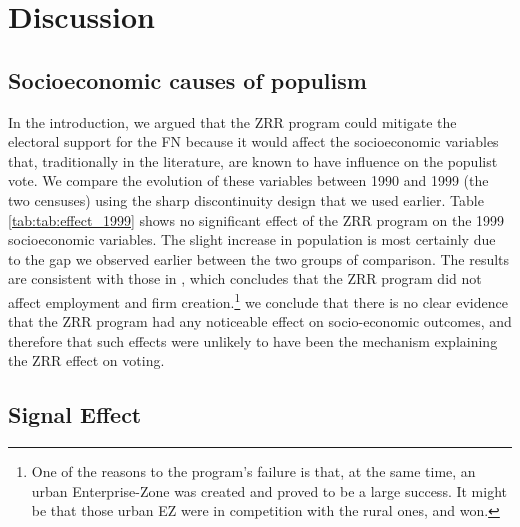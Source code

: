 \section{Discussion}\label{results}
\subsection{Socioeconomic causes of populism}

In the introduction, we argued that the ZRR program could mitigate the electoral support for the FN because it would affect the socioeconomic variables that, traditionally in the literature, are known to have influence on the populist vote. We compare the evolution of these variables between 1990 and 1999 (the two censuses) using the sharp discontinuity design that we used earlier. %
Table \ref{tab:tab:effect_1999} shows no significant effect of the ZRR program on the 1999 socioeconomic variables. The slight increase in population is most certainly due to the gap we observed earlier between the two groups of comparison. %
The results are consistent with those in \cite{BEHAGHEL20151}, which concludes that the ZRR program did not affect employment and firm creation.\footnote{One of the reasons to the program's failure is that, at the same time, an urban Enterprise-Zone was created and proved to be a large success. It might be that those urban EZ were in competition with the rural ones, and won.} we conclude that there is no clear evidence that the ZRR program had any noticeable effect on socio-economic outcomes, and therefore that such effects were unlikely to have been the mechanism explaining the ZRR effect on voting. %






\subsection{Signal Effect}

